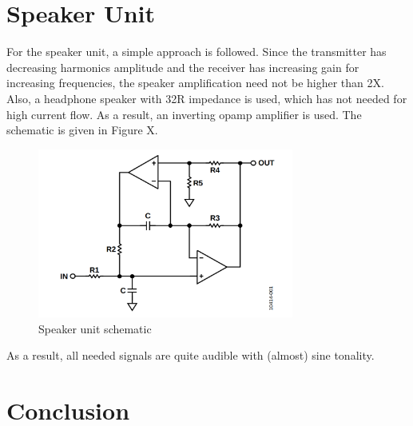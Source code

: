 \documentclass[letterpaper,12pt]{article}
\begin{document}
\section{Speaker Unit}
For the speaker unit, a simple approach is followed. Since the transmitter has decreasing harmonics amplitude and the receiver has increasing gain for increasing frequencies, the speaker amplification need not be higher than 2X. Also, a headphone speaker with 32R impedance is used, which has not needed for high current flow. As a result, an inverting opamp amplifier is used. The schematic is given in Figure X.
\begin{figure}[H]
    \centering
    \includegraphics[width = 0.75\textwidth]{dualopamp.png}
    \caption{Speaker unit schematic}
\end{figure}
As a result, all needed signals are quite audible with (almost) sine tonality. 
\section{Conclusion}
\end{document}
